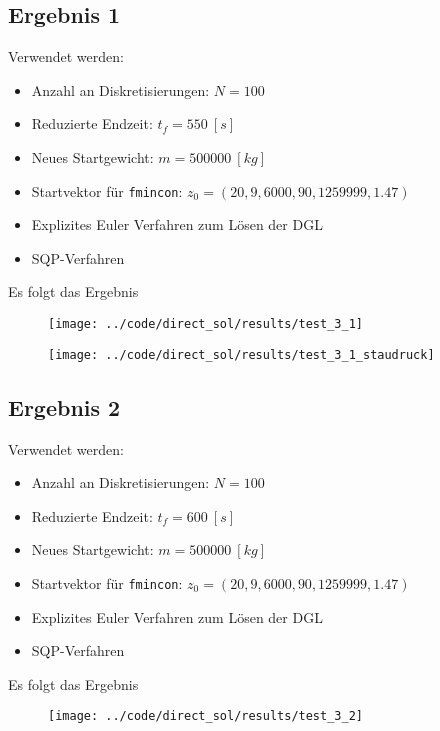 \subsection{Ergebnis 1}\label{kap:Versuch31}
Verwendet werden:
\begin{itemize}
\item Anzahl an Diskretisierungen: $N = 100$ 
\item Reduzierte Endzeit: $t_f = 550 \ [s]$
\item Neues Startgewicht: $m = 500000 \ [kg]$
\item Startvektor für \texttt{fmincon}: $z_0 = (20,9,6000,90,1259999,1.47)$
\item Explizites Euler Verfahren zum Lösen der DGL
%
\item SQP-Verfahren
\end{itemize}
Es folgt das Ergebnis
\begin{figure}[H]
\begin{center}
\texttt{[image: ../code/direct\_sol/results/test\_3\_1]}
 \label{img:test_3_1}
\end{center}
\end{figure}

\begin{figure}[H]
\begin{center}
\texttt{[image: ../code/direct\_sol/results/test\_3\_1\_staudruck]}
\label{img:test_3_1_staudruck}
\end{center}
\end{figure}




\subsection{Ergebnis 2}\label{kap:Versuch32}
Verwendet werden:
\begin{itemize}
\item Anzahl an Diskretisierungen: $N = 100$ 
\item Reduzierte Endzeit: $t_f = 600 \ [s]$
\item Neues Startgewicht: $m = 500000 \ [kg]$
\item Startvektor für \texttt{fmincon}: $z_0 = (20,9,6000,90,1259999,1.47)$
\item Explizites Euler Verfahren zum Lösen der DGL
%
\item SQP-Verfahren
\end{itemize}
Es folgt das Ergebnis
\begin{figure}[H]
\begin{center}
\texttt{[image: ../code/direct\_sol/results/test\_3\_2]}
 \label{img:test_3_2}
\end{center}
\end{figure}

